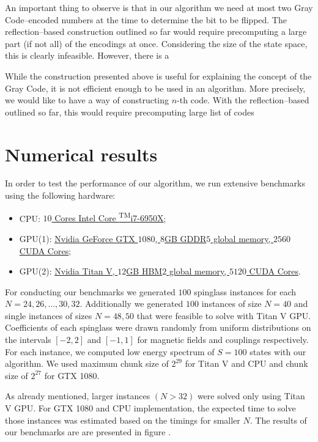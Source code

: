 An important thing to observe is that in our algorithm we need at most two Gray Code--encoded numbers at the time to determine the bit to be flipped. The reflection--based construction outlined so far would require precomputing a large part (if not all) of the encodings at once. Considering the size of the state space, this is clearly infeasible. However, there is a

While the construction presented above is useful for explaining the concept of the Gray Code, it is not efficient enough to be used in an algorithm. More precisely, we would like to have a way of constructing $n$-th code. With the reflection--based outlined so far, this would require precomputing large list of codes

\section{Numerical results}
In order to test the performance of our algorithm, we run extensive benchmarks using the following hardware:
%
\begin{itemize}
\item CPU:
\href{https://ark.intel.com/products/94456/Intel-Core-i7-6950X-Processor-Extreme-Edition-25M-Cache-up-to-3-50-GHz-}{$10$
Cores {\rmfamily Intel\textregistered} Core \textsuperscript{TM}i7-6950X};
%
\item GPU(1): \href{https://www.nvidia.com/en-us/geforce/products/10series/geforce-gtx-1080}{Nvidia GeForce GTX $1080$, $8$GB GDDR$5$ global memory, $2560$ CUDA Cores};
%
\item  GPU(2): \href{https://www.nvidia.com/en-us/titan/titan-v/}{Nvidia Titan V, $12$GB HBM$2$ global memory, $5120$ CUDA Cores}.
\end{itemize}

For conducting our benchmarks we generated $100$ spinglass instances for each $N=24, 26, \ldots, 30, 32$. Additionally we generated $100$ instances of size $N=40$ and single instances of sizes $N=48, 50$ that were feasible to solve with Titan V GPU. Coefficients of each spinglass were drawn randomly from uniform distributions on the intervals $[-2, 2]$ and $[-1, 1]$ for magnetic fields and couplings respectively. For each instance, we computed low energy spectrum of $S=100$ states with our algorithm. We used maximum chunk size of $2^{29}$ for Titan V and CPU and chunk size of $2^{27}$ for GTX 1080.

As already mentioned, larger instances $(N > 32)$ were solved only using Titan V GPU. For GTX 1080 and CPU implementation, the expected time to solve those instances was estimated based on the timings for smaller $N$. The results of our benchmarks are are presented in figure .

